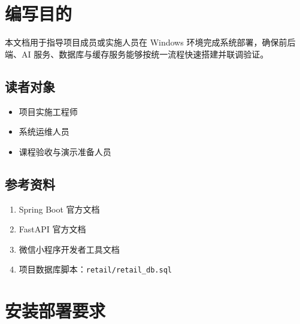 
\setcounter{section}{0}
\renewcommand{\thesection}{\arabic{section}}
\renewcommand{\thesubsection}{\thesection.\arabic{subsection}}
\renewcommand{\thesubsubsection}{\thesubsection.\arabic{subsubsection}}

\section{编写目的}
本文档用于指导项目成员或实施人员在 Windows 环境完成系统部署，确保前后端、AI 服务、数据库与缓存服务能够按统一流程快速搭建并联调验证。

\subsection{读者对象}
\begin{itemize}[leftmargin=2em]
  \item 项目实施工程师
  \item 系统运维人员
  \item 课程验收与演示准备人员
\end{itemize}

\subsection{参考资料}
\begin{enumerate}[leftmargin=2em]
  \item Spring Boot 官方文档
  \item FastAPI 官方文档
  \item 微信小程序开发者工具文档
  \item 项目数据库脚本：\texttt{retail/retail\_db.sql}
\end{enumerate}

\section{安装部署要求}


